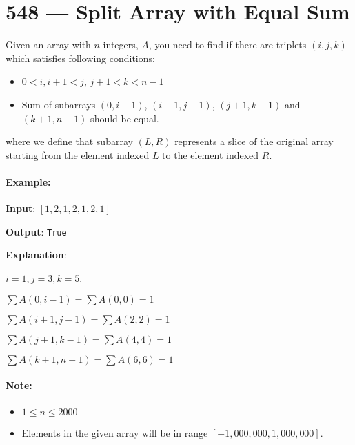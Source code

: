 \section{548 --- Split Array with Equal Sum}
Given an array with $n$ integers, $A$, you need to find if there are triplets $(i, j, k)$ which satisfies following conditions:

\begin{itemize}
\item$ 0 < i, i + 1 < j$, $j + 1 < k < n - 1$
\item Sum of subarrays $(0, i - 1)$, $ (i + 1, j - 1) $, $(j + 1, k - 1)$ and $(k + 1, n - 1)$ should be equal.
\end{itemize}

where we define that subarray $ (L, R) $ represents a slice of the original array starting from the element indexed $L$ to the element indexed $R$.

\paragraph{Example:}

\begin{flushleft}
\textbf{Input}: $[1,2,1,2,1,2,1]$

\textbf{Output}: \texttt{True}

\textbf{Explanation}:

$i = 1, j = 3, k = 5$.

$\sum A(0, i - 1) = \sum A(0, 0) = 1$

$\sum A(i + 1, j - 1) = \sum A(2, 2) = 1$

$\sum A(j + 1, k - 1) = \sum A(4, 4) = 1$

$\sum A(k + 1, n - 1) = \sum A(6, 6) = 1$
\end{flushleft}

\paragraph{Note:}

\begin{itemize}
\item $1 \leq n \leq 2000$
\item Elements in the given array will be in range $[-1,000,000, 1,000,000]$.
\end{itemize}

